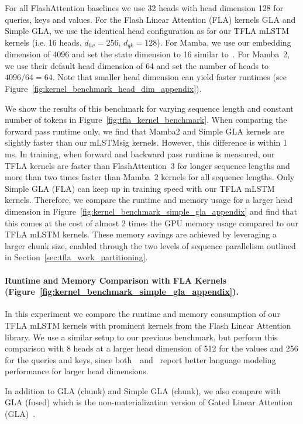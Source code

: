 \documentclass{article}
\begin{document}
    For all FlashAttention baselines we use 32 heads with head dimension 128 for queries, keys and values.
    For the Flash Linear Attention (FLA) kernels GLA and Simple GLA, we use the identical head configuration as for our TFLA mLSTM kernels (i.e. 16 heads, $d_{hv}=256$, $d_{qk}=128$).
    For Mamba, we use our embedding dimension of 4096 and set the state dimension to 16 similar to~\citet{Gu:24mamba}.
    For Mamba~2, we use their default head dimension of 64 and set the number of heads to $4096 / 64 = 64$. Note that smaller head dimension can yield faster runtimes (see Figure~\ref{fig:kernel_benchmark_head_dim_appendix}).

    We show the results of this benchmark for varying sequence length and constant number of tokens in Figure~\ref{fig:tfla_kernel_benchmark}.
    When comparing the forward pass runtime only, we find that Mamba2 and Simple GLA kernels are slightly faster than our mLSTMsig kernels. However, this difference is within 1 ms.
    In training, when forward and backward pass runtime is measured, our TFLA kernels are faster than FlashAttention~3 for longer sequence lengths and more than two times faster than Mamba~2 kernels for all sequence lengths.
    Only Simple GLA (FLA) can keep up in training speed with our TFLA mLSTM kernels.
    Therefore, we compare the runtime and memory usage for a larger head dimension in Figure~\ref{fig:kernel_benchmark_simple_gla_appendix} and find that this comes at the cost of almost 2 times the GPU memory usage compared to our TFLA mLSTM kernels.
    These memory savings are achieved by leveraging a larger chunk size, enabled through the two levels of sequence parallelism outlined in Section~\ref{sec:tfla_work_partitioning}.

    \paragraph{Runtime and Memory Comparison with FLA Kernels (Figure~\ref{fig:kernel_benchmark_simple_gla_appendix}).}
    In this experiment we compare the runtime and memory consumption of our TFLA mLSTM kernels with prominent kernels from the Flash Linear Attention library. We use a similar setup to our previous benchmark, but perform this comparison with 8 heads at a larger head dimension of 512 for the values and 256 for the queries and keys, since both~\citet{beck:24xlstm}~and~\citet{yang:24gated} report better language modeling performance for larger head dimensions.

    In addition to GLA (chunk) and Simple GLA (chunk), we also compare with GLA (fused) which is the non-materialization version of Gated Linear Attention (GLA)~\citep{yang:24gated}.
\end{document}
